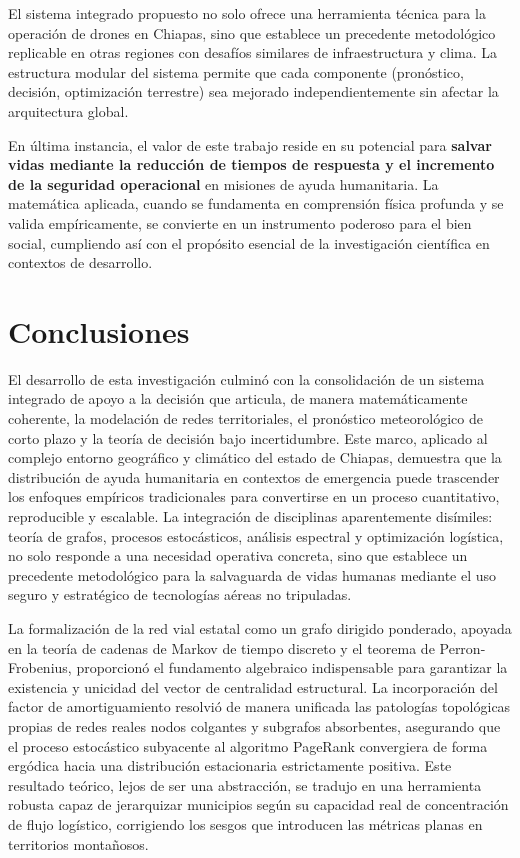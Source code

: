 \documentclass[
  spanish,
  us-letterpaper,
]{scrreprt}
\numberwithin{equation}{section}
\begin{document}
El sistema integrado propuesto no solo ofrece una herramienta técnica
para la operación de drones en Chiapas, sino que establece un precedente
metodológico replicable en otras regiones con desafíos similares de
infraestructura y clima. La estructura modular del sistema permite que
cada componente (pronóstico, decisión, optimización terrestre) sea
mejorado independientemente sin afectar la arquitectura global.

En última instancia, el valor de este trabajo reside en su potencial
para \textbf{salvar vidas mediante la reducción de tiempos de respuesta
y el incremento de la seguridad operacional} en misiones de ayuda
humanitaria. La matemática aplicada, cuando se fundamenta en comprensión
física profunda y se valida empíricamente, se convierte en un
instrumento poderoso para el bien social, cumpliendo así con el
propósito esencial de la investigación científica en contextos de
desarrollo.


\chapter{Conclusiones}\label{conclusiones}

El desarrollo de esta investigación culminó con la consolidación de un
sistema integrado de apoyo a la decisión que articula, de manera
matemáticamente coherente, la modelación de redes territoriales, el
pronóstico meteorológico de corto plazo y la teoría de decisión bajo
incertidumbre. Este marco, aplicado al complejo entorno geográfico y
climático del estado de Chiapas, demuestra que la distribución de ayuda
humanitaria en contextos de emergencia puede trascender los enfoques
empíricos tradicionales para convertirse en un proceso cuantitativo,
reproducible y escalable. La integración de disciplinas aparentemente
disímiles: teoría de grafos, procesos estocásticos, análisis espectral y
optimización logística, no solo responde a una necesidad operativa
concreta, sino que establece un precedente metodológico para la
salvaguarda de vidas humanas mediante el uso seguro y estratégico de
tecnologías aéreas no tripuladas.

La formalización de la red vial estatal como un grafo dirigido
ponderado, apoyada en la teoría de cadenas de Markov de tiempo discreto
y el teorema de Perron-Frobenius, proporcionó el fundamento algebraico
indispensable para garantizar la existencia y unicidad del vector de
centralidad estructural. La incorporación del factor de amortiguamiento
resolvió de manera unificada las patologías topológicas propias de redes
reales nodos colgantes y subgrafos absorbentes, asegurando que el
proceso estocástico subyacente al algoritmo PageRank convergiera de
forma ergódica hacia una distribución estacionaria estrictamente
positiva. Este resultado teórico, lejos de ser una abstracción, se
tradujo en una herramienta robusta capaz de jerarquizar municipios según
su capacidad real de concentración de flujo logístico, corrigiendo los
sesgos que introducen las métricas planas en territorios montañosos.
\end{document}
